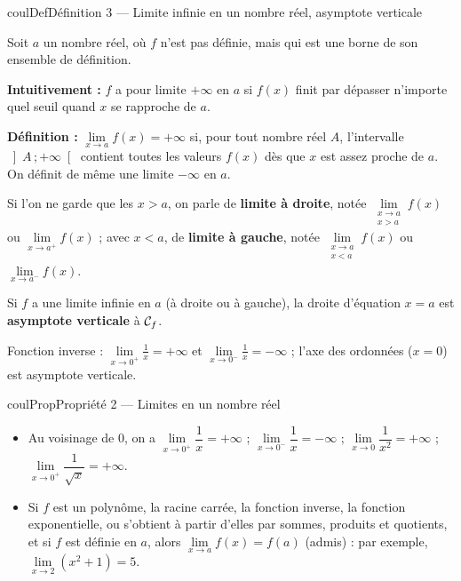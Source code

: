\documentclass[11pt,a4paper]{article}
\makeatletter
\newcommand{\lycee@repere}[4]{%
  \draw[grille,step=1] (#1,#2) grid (#3,#4);
  \draw[-{Stealth[length=2mm]},thick] (#1,0)--({#3+0.4},0) node[below left=-1pt]{$x$};
  \draw[-{Stealth[length=2mm]},thick] (0,#2)--(0,{#4+0.4}) node[below left=-1pt]{$y$};
  \node[below left,font=\scriptsize,inner sep=1.5pt] at (0,0) {$0$};}
\newcommand{\lycee@gradx}[1]{\foreach \k/\l in {#1}{%
  \draw (\k,0.07)--(\k,-0.07) node[below,font=\scriptsize,inner sep=1.5pt]{$\l$};}}
\newcommand{\lycee@grady}[1]{\foreach \k/\l in {#1}{%
  \draw (0.07,\k)--(-0.07,\k) node[left,font=\scriptsize,inner sep=1.5pt]{$\l$};}}
\newcommand{\lycee@intoo}[2]{\left]#1\,;#2\right[}
\providecommand{\repere}{\lycee@repere}%
\providecommand{\gradx}{\lycee@gradx}%
\providecommand{\grady}{\lycee@grady}%
\providecommand{\Cf}{\mathcal{C}\sb{f}}%
\providecommand{\intoo}{\lycee@intoo}%
\newcounter{lycee@signet}
\newcommand{\signet}[3][]{\stepcounter{lycee@signet}%
  \edef\lycee@dest{\if\relax\detokenize{#1}\relax
    signet.\arabic{lycee@signet}\else#1\fi}%
  \hypertarget{\lycee@dest}{}\bookmark[level=#2,dest=\lycee@dest]{#3}}
\newenvironment{definitionbox}[1][Définition]%
  {\begin{boitecours}[phantom={\signet{2}{#1}}]{coulDef}{#1}}{\end{boitecours}}
\newenvironment{proprietebox}[1][Propriété]%
  {\begin{boitecours}[phantom={\signet{2}{#1}}]{coulProp}{#1}}{\end{boitecours}}
\makeatother
\begin{document}
\begin{definitionbox}[Définition 3 --- Limite infinie en un nombre réel, asymptote verticale]
\begin{minipage}[c]{0.58\linewidth}\raggedright
Soit $a$ un nombre réel, où $f$ n'est pas définie, mais qui est une borne de son
ensemble de définition.

\smallskip
\textbf{Intuitivement :} $f$ a pour limite $+\infty$ en $a$ si $f(x)$ finit par dépasser
n'importe quel seuil quand $x$ se rapproche de $a$.

\smallskip
\textbf{Définition :} $\lim\limits_{x\to a}f(x)=+\infty$ si, pour tout nombre réel $A$,
l'intervalle $\intoo{A}{+\infty}$ contient toutes les valeurs $f(x)$ dès que $x$ est
assez proche de $a$. On définit de même une limite $-\infty$ en $a$.

\smallskip
Si l'on ne garde que les $x>a$, on parle de \textbf{limite à droite}, notée
$\lim\limits_{\substack{x\to a\\ x>a}}f(x)$ ou $\lim\limits_{x\to a^{+}}f(x)$ ; avec
$x<a$, de \textbf{limite à gauche}, notée $\lim\limits_{\substack{x\to a\\ x<a}}f(x)$ ou
$\lim\limits_{x\to a^{-}}f(x)$.

\smallskip
Si $f$ a une limite infinie en $a$ (à droite ou à gauche), la droite d'équation $x=a$
est \textbf{asymptote verticale} à $\Cf$.
\end{minipage}\hfill
\begin{minipage}[c]{0.38\linewidth}\centering
{}

{\footnotesize Fonction inverse : $\lim\limits_{x\to 0^{+}}\frac{1}{x}=+\infty$ et
$\lim\limits_{x\to 0^{-}}\frac{1}{x}=-\infty$ ; l'axe des ordonnées ($x=0$) est
asymptote verticale.}
\end{minipage}
\end{definitionbox}

\begin{proprietebox}[Propriété 2 --- Limites en un nombre réel]
\begin{itemize}
  \item Au voisinage de $0$, on a $\lim\limits_{x\to 0^{+}}\dfrac{1}{x}=+\infty$ ;
        $\lim\limits_{x\to 0^{-}}\dfrac{1}{x}=-\infty$ ;
        $\lim\limits_{x\to 0}\dfrac{1}{x^{2}}=+\infty$ ;
        $\lim\limits_{x\to 0^{+}}\dfrac{1}{\sqrt{x}}=+\infty$.
  \item Si $f$ est un polynôme, la racine carrée, la fonction inverse, la fonction
        exponentielle, ou s'obtient à partir d'elles par sommes, produits et quotients,
        et si $f$ est définie en $a$, alors $\lim\limits_{x\to a}f(x)=f(a)$ (admis) :
        par exemple, $\lim\limits_{x\to 2}\left(x^{2}+1\right)=5$.
\end{itemize}
\end{proprietebox}
\end{document}
